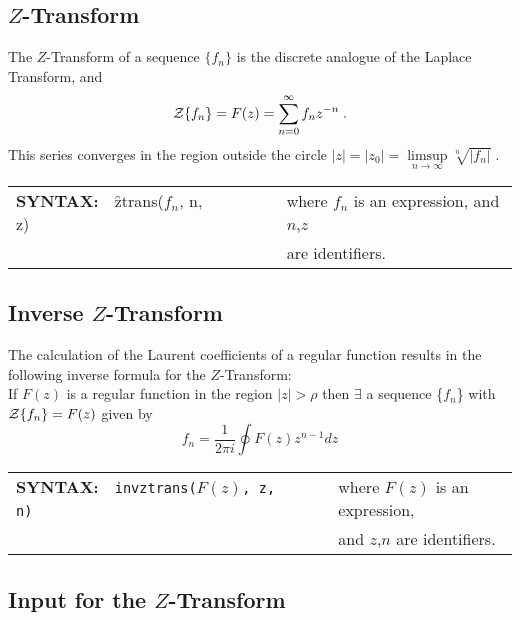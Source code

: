 

\subsection[Z-Transform]{$Z$-Transform}
\hypertarget{operator:ZTRANS}{}
  The $Z$-Transform of a sequence $\{f_n\}$ is the discrete analogue
  of the Laplace Transform, and
  \[{\cal Z}\{f_n\} = F(z) = \sum^\infty_{n=0} f_nz^{-n}\;.\]
  This series converges in the region outside the circle
  $|z|=|z_0|= \limsup\limits_{n \rightarrow \infty} \sqrt[n]{|f_n|}\;.$


\begin{tabular}{@{}l@{}l}
  \textbf{SYNTAX:}\ \ {\f{ztrans}($f_n$, n,  z)}\ \ \ \ \ \ \ \
  & where $f_n$ is an expression, and $n$,$z$ \\
  & are identifiers.
\end{tabular}


\subsection[Inverse Z-Transform]{Inverse $Z$-Transform}
\hypertarget{operator:INVZTRANS}{}
  The calculation of the Laurent coefficients of a regular function
  results in the following inverse formula for the $Z$-Transform:
  \\
  If $F(z)$ is a regular function in the region $|z|> \rho$ then
  $\exists$ a sequence \{$f_n$\} with ${\cal Z} \{f_n\}=F(z)$
  given by
  \[f_n = \frac{1}{2 \pi i}\oint F(z) z^{n-1} dz\]


\begin{tabular}{@{}l@{}l}
  \textbf{SYNTAX:}\ \ {\tt invztrans($F(z)$, z,  n)}\ \ \ \ \ \ \ \
  & where $F(z)$ is an expression, \\
  & and $z$,$n$ are identifiers.
\end{tabular}


\subsection[Input for the Z-Transform]{Input for the $Z$-Transform}

